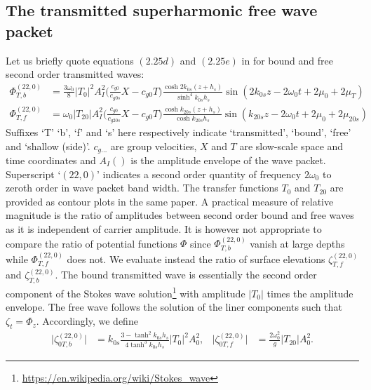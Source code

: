 \documentclass[internal]{sintefmemo}
\begin{document}
\subsection{The transmitted superharmonic free wave packet}
Let us briefly quote equations $(2.25d)$ and $(2.25e)$ in \citet{li_2021_step1} for bound and free second order transmitted waves:
\begin{subequations}
\begin{align}
\Phi_{T,b}^{(22,0)} &= \frac{3\omega_0}{8} |T_0|^2A_I^2\bigg(\frac{c_{g0}}{c_{g0s}}X -c_{g0}T\bigg)
\frac{\cosh 2 k_{0s}(z+h_s)}{\sinh^4k_{0s}h_s} \sin(2k_{0s}z - 2\omega_0 t +2\mu_0+2\mu_T)
\\
\Phi_{T,f}^{(22,0)} &= \omega_0 |T_{20}|A_I^2\bigg(\frac{c_{g0}}{c_{g20s}}X -c_{g0}T\bigg)
\frac{\cosh k_{20s}(z+h_s)}{\cosh k_{20s}h_s} \sin(k_{20s}z - 2\omega_0 t +2\mu_0+2\mu_{20s})
\end{align}%
\label{eq:Phi}%
\end{subequations}%
Suffixes `T' `b', `f' and `s' here respectively indicate `transmitted', `bound', `free' and `shallow (side)'. $c_{g\dots}$ are group velocities, $X$ and $T$ are slow-scale space and time coordinates and $A_I()$ is the amplitude envelope of the wave packet. Superscript `$(22,0)$' indicates a second order quantity of frequency $2\omega_0$ to zeroth order in wave packet band width.
The transfer functions $T_0$ and $T_{20}$ are provided as contour plots in the same paper.
A practical measure of relative magnitude is the ratio of amplitudes between second order bound and free waves as it is independent of carrier amplitude. 
It is however not appropriate to compare the ratio of potential functions $\Phi$ since $\Phi_{T,b}^{(22,0)}$ vanish at large depths while $\Phi_{T,f}^{(22,0)}$ does not. 
We evaluate instead the ratio of surface elevations $\zeta_{T,f}^{(22,0)}$ and $\zeta_{T,b}^{(22,0)}$. %
The bound transmitted wave is essentially the second order component of the Stokes wave solution\footnote{\url{https://en.wikipedia.org/wiki/Stokes_wave}} with amplitude $|T_0|$ times the amplitude envelope. 
The free wave follows the solution of the liner components such that $\zeta_t = \Phi_z$. Accordingly, we define
\begin{align}
\big|\zeta_{0T,b}^{(22,0)}\big| &= k_{0s}\frac{3-\tanh^2k_{0s}h_s}{4\tanh^3k_{0s}h_s} |T_0|^2 A_0^2 ,
&
\big|\zeta_{0T,f}^{(22,0)}\big| &= \frac{2\omega_0^2}{g}|T_{20}| A_0^2.
\end{align}%
\end{document}
